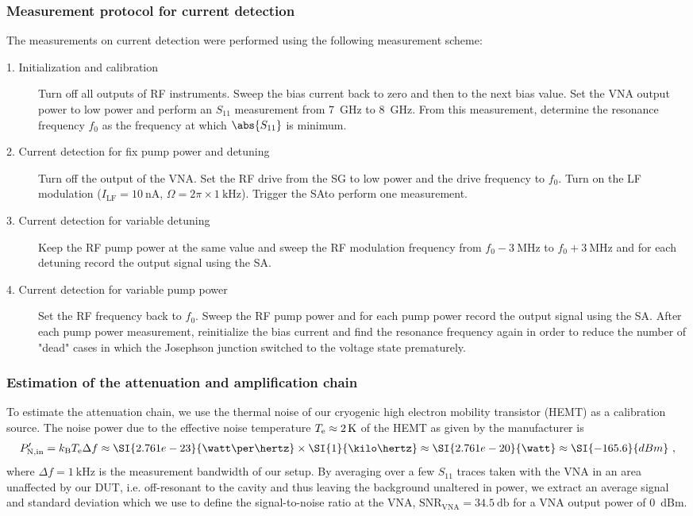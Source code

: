 \subsubsection{Measurement protocol for current detection}
% 
The measurements on current detection were performed using the following measurement scheme:
% 
\begin{description}
	\item[1. Initialization and calibration] Turn off all outputs of RF instruments.
	Sweep the bias current back to zero and then to the next bias value.
	Set the VNA output power to low power and perform an $S_{11}$ measurement from \SI{7}{GHz} to \SI{8}{GHz}.
	From this measurement, determine the resonance frequency $f_0$ as the frequency at which $\abs{S_{11}}$ is minimum.
	\item[2. Current detection for fix pump power and detuning] Turn off the output of the VNA.
	Set the RF drive from the SG to low power and the drive frequency to $f_0$.
	Turn on the LF modulation ($I_\text{LF}=\SI{10}{\nano\ampere}$, $\Omega=2\pi\times\SI{1}{\kilo\hertz}$).
	Trigger the SAto perform one measurement.
	\item[3. Current detection for variable detuning] Keep the RF pump power at the same value and sweep the RF modulation frequency from $f_0-\SI{3}{\mega\hertz}$ to $f_0+\SI{3}{\mega\hertz}$ and for each detuning record the output signal using the SA.
	\item[4. Current detection for variable pump power] Set the RF frequency back to $f_0$.
	Sweep the RF pump power and for each pump power record the output signal using the SA.
	After each pump power measurement, reinitialize the bias current and find the resonance frequency again in order to reduce the number of "dead" cases in which the Josephson junction switched to the voltage state prematurely.
\end{description}

\subsubsection{Estimation of the attenuation and amplification chain}\label{sec:attenuation}

To estimate the attenuation chain, we use the thermal noise of our cryogenic high electron mobility transistor (HEMT) as a calibration source.
% 
The noise power due to the effective noise temperature $T_{\rm e}\approx2{\,\rm K}$ of the HEMT as given by the manufacturer is
% 
\begin{align}
P_{\rm N,in}^\prime=k_{\rm B}T_{\rm e}\Delta f \approx \SI{2.761e-23}{\watt\per\hertz} \times \SI{1}{\kilo\hertz} \approx \SI{2.761e-20}{\watt} \approx \SI{-165.6}{dBm}\ ,
\label{eq:HEMTnoise}
\end{align}
% 
where $\Delta f=\SI{1}{\kilo\hertz}$ is the measurement bandwidth of our setup.
% 
By averaging over a few $S_{11}$ traces taken with the VNA in an area unaffected by our DUT, i.e. off-resonant to the cavity and thus leaving the background unaltered in power, we extract an average signal and standard deviation which we use to define the signal-to-noise ratio at the VNA, $\text{SNR}_\text{VNA}=\SI{34.5}{\decibel}$ for a VNA output power of \SI{0}{dBm}.

